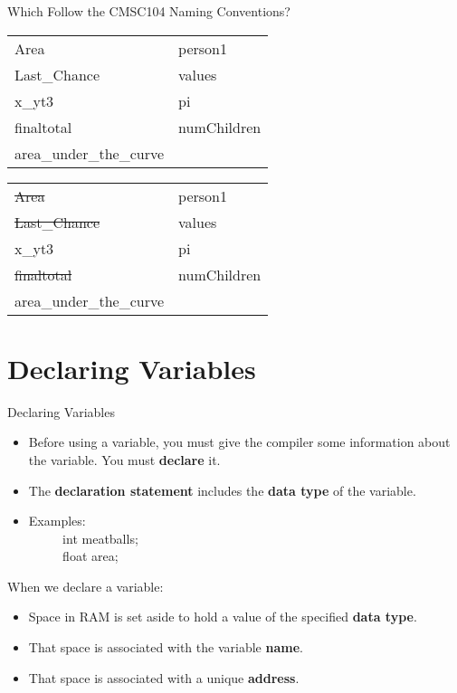 \documentclass[graphics]{beamer}
\begin{document}
\begin{frame}{Which Follow the CMSC104 Naming Conventions?}
    \centering
     {
        \begin{tabular}{l l}
            Area & person1 \\ [5pt]
            Last\_Chance & values \\ [5pt]
            x\_yt3 & pi \\ [5pt]
            finaltotal & numChildren \\ [5pt]
            area\_under\_the\_curve
        \end{tabular}
    }
     {
        \begin{tabular}{l l}
            \sout{Area} & person1 \\ [5pt]
            \sout{Last\_Chance} & values \\ [5pt]
            x\_yt3 & pi \\ [5pt]
            \sout{finaltotal} & numChildren \\ [5pt]
            area\_under\_the\_curve
        \end{tabular}
    }
\end{frame}

\section{Declaring Variables}
\begin{frame}{Declaring Variables}
     {
        \begin{itemize}
            \item Before using a variable, you must give the compiler some information about the variable. You must \textbf{declare} it.
            \item The \textbf{declaration statement} includes the \textbf{data type} of the variable.
            \item Examples: \\
            ~~ ~~ int meatballs; \\
            ~~ ~~ float area;
        \end{itemize}
    }
     {
        When we declare a variable:
        \begin{itemize}
            \item Space in RAM is set aside to hold a value of the specified \textbf{data type}.
            \item That space is associated with the variable \textbf{name}.
            \item That space is associated with a unique \textbf{address}.
        \end{itemize}
        
    }
\end{frame}
\end{document}
